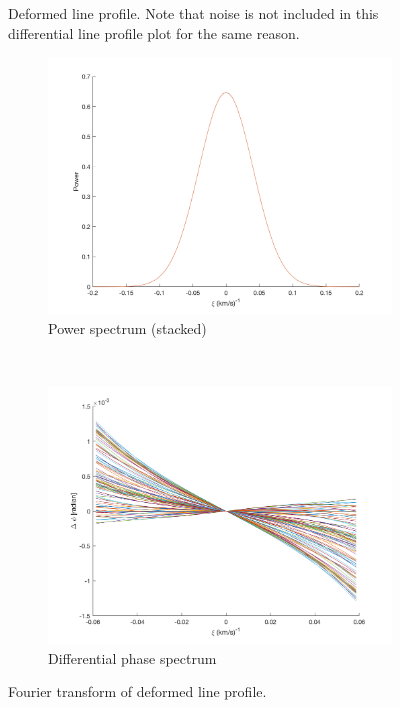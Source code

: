 \begin{figure}[tbp]
    \caption[Deformed line profile]{Deformed line profile. Note that noise is not included in  
    this differential line profile plot for the same reason.}
\label{fig:line_profiles_deformation}
\end{figure}	

\begin{figure}[tbp]	
    \begin{subfigure}[b]{0.49\textwidth}
        \includegraphics[width=\textwidth]{./Figures/Methods/LPD2-FT_power.png}
        \caption{Power spectrum (stacked)}
    \end{subfigure}
	~
    \begin{subfigure}[b]{0.49\textwidth}
        \includegraphics[width=\textwidth]{./Figures/Methods/LPD4-Relative_phase_angle.png}
        \caption{Differential phase spectrum}
        \label{fig:dps_LPD}
    \end{subfigure}	
    
    \caption[Fourier transform of deformed line profile]{Fourier transform of deformed line profile.}
\label{fig:FT_process_LPD}
\end{figure}    

